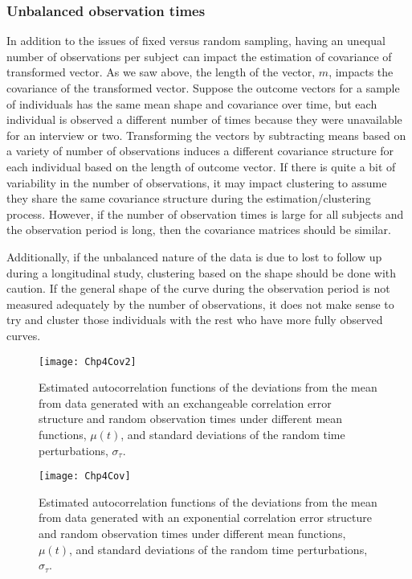 \documentclass[12pt]{article}
\begin{document}
\subsubsection{Unbalanced observation times}
In addition to the issues of fixed versus random sampling, having an unequal number of observations per subject can impact the estimation of covariance of transformed vector. As we saw above, the length of the vector, $m$, impacts the covariance of the transformed vector. Suppose the outcome vectors for a sample of individuals has the same mean shape and covariance over time, but each individual is observed a different number of times because they were unavailable for an interview or two. Transforming the vectors by subtracting means based on a variety of number of observations induces a different covariance structure for each individual based on the length of outcome vector. If there is quite a bit of variability in the number of observations, it may impact clustering to assume they share the same covariance structure during the estimation/clustering process. However, if the number of observation times is large for all subjects and the observation period is long, then the covariance matrices should be similar. 

Additionally, if the unbalanced nature of the data is due to lost to follow up during a longitudinal study, clustering based on the shape should be done with caution. If the general shape of the curve during the observation period is not measured adequately by the number of observations, it does not make sense to try and cluster those individuals with the rest who have more fully observed curves. 

\begin{landscape}
\begin{figure}
\begin{center}
\texttt{[image: Chp4Cov2]}
\end{center}
\caption{Estimated autocorrelation functions of the deviations from the mean from data generated with an exchangeable correlation error structure and random observation times under different mean functions, $\mu(t)$, and standard deviations of the random time perturbations, $\sigma_{\tau}$.}
\label{fig:cov1}
\end{figure}

\begin{figure}
\begin{center}
\texttt{[image: Chp4Cov]}
\end{center}
\caption{Estimated autocorrelation functions of the deviations from the mean from data generated with an exponential correlation error structure and random observation times under different mean functions, $\mu(t)$, and standard deviations of the random time perturbations, $\sigma_{\tau}$.}
\label{fig:cov}
\end{figure}
\end{landscape}
\end{document}
